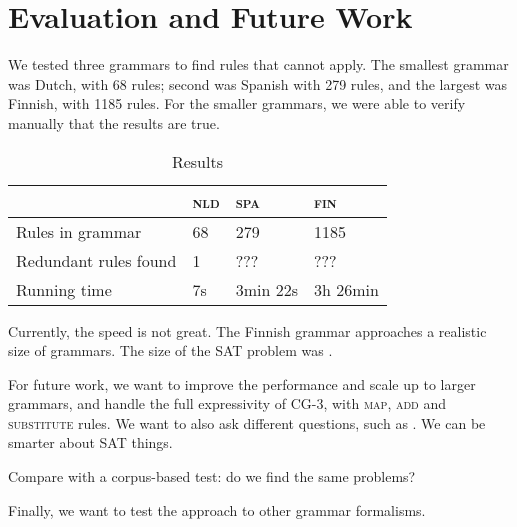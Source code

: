 \section{Evaluation and Future Work}
\label{sec:eval}

We tested three grammars to find rules that cannot apply. The smallest grammar was Dutch, with 68 rules; second was Spanish with 279 rules, and the largest was Finnish, with 1185 rules.
For the smaller grammars, we were able to verify manually that the results are true.

\begin{table}[]
\centering
\begin{tabular}{|l|l|l|l|}
\hline
                      & \textsc{nld}  & \textsc{spa}  & \textsc{fin}  \\ \hline
Rules in grammar      & 68              & 279               & 1185              \\ \hline
Redundant rules found & 1               & ???               & ???    \\ \hline
Running time          & 7s              & 3min 22s          & 3h 26min    \\ \hline
\end{tabular}
\caption{Results}
\label{table:res}
\end{table}



Currently, the speed is not great. The Finnish grammar approaches a realistic size of grammars.
The size of the SAT problem was .



For future work, we want to improve the performance and scale up to larger grammars, and handle the full expressivity of CG-3, with \textsc{map}, \textsc{add} and \textsc{substitute} rules.
We want to also ask different questions, such as .
We can be smarter about SAT things.

Compare with a corpus-based test: do we find the same problems?

Finally, we want to test the approach to other grammar formalisms.




